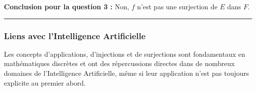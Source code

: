 \documentclass[12pt,a4paper]{report}
\begin{document}
\textbf{Conclusion pour la question 3 :} Non, \(f\) n'est pas une
surjection de \(E\) dans \(F\).

\begin{center}\rule{0.5\linewidth}{0.5pt}\end{center}

\subsubsection{Liens avec l'Intelligence
Artificielle}\label{liens-avec-lintelligence-artificielle}

Les concepts d'applications, d'injections et de surjections sont
fondamentaux en mathématiques discrètes et ont des répercussions
directes dans de nombreux domaines de l'Intelligence Artificielle, même
si leur application n'est pas toujours explicite au premier abord.
\end{document}
